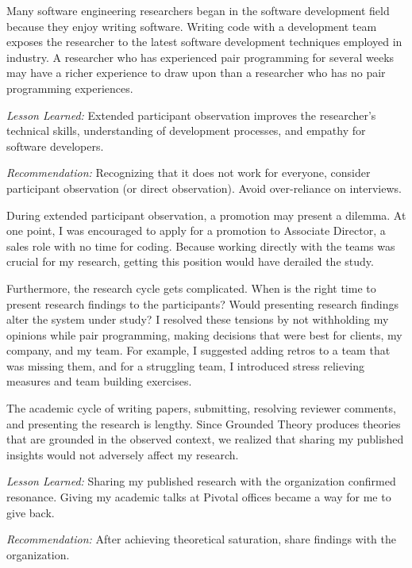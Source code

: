 
Many software engineering researchers began in the software development field because they enjoy writing software. Writing code with a development team exposes the researcher to the latest software development techniques employed in industry. A researcher who has experienced pair programming for several weeks may have a richer experience to draw upon than a researcher who has no pair programming experiences.

\textit{Lesson Learned:} Extended participant observation improves the researcher's technical skills, understanding of development processes, and empathy for software developers.

\textit{Recommendation:} Recognizing that it does not work for everyone, consider participant observation (or direct observation). Avoid over-reliance on interviews.

During extended participant observation, a promotion may present a dilemma. At one point, I was encouraged to apply for a promotion to Associate Director, a sales role with no time for coding. Because working directly with the teams was crucial for my research, getting this position would have derailed the study.

Furthermore, the research cycle gets complicated. When is the right time to present research findings to the participants? Would presenting research findings alter the system under study? I resolved these tensions by not withholding my opinions while pair programming, making decisions that were best for clients, my company, and my team. For example, I suggested adding retros to a team that was missing them, and for a struggling team, I introduced stress relieving measures and team building exercises.

The academic cycle of writing papers, submitting, resolving reviewer comments, and presenting the research is lengthy. Since Grounded Theory produces theories that are grounded in the observed context, we realized that sharing my published insights would not adversely affect my research. 

\textit{Lesson Learned:} Sharing my published research with the organization confirmed resonance. Giving my academic talks at Pivotal offices became a way for me to give back.  

\textit{Recommendation:} After achieving theoretical saturation, share findings with the organization. 

